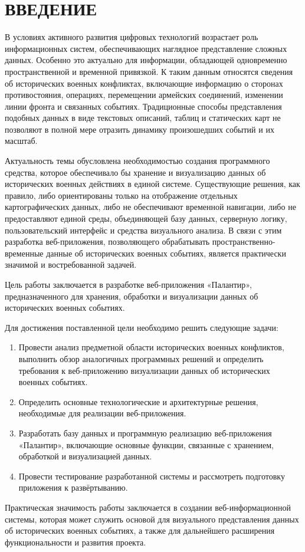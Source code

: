 \chapter*{ВВЕДЕНИЕ}

В условиях активного развития цифровых технологий возрастает роль информационных систем, обеспечивающих наглядное представление сложных данных. Особенно это актуально для информации, обладающей одновременно пространственной и временной привязкой. К таким данным относятся сведения об исторических военных конфликтах, включающие информацию о сторонах противостояния, операциях, перемещении армейских соединений, изменении линии фронта и связанных событиях. Традиционные способы представления подобных данных в виде текстовых описаний, таблиц и статических карт не позволяют в полной мере отразить динамику произошедших событий и их масштаб.

Актуальность темы обусловлена необходимостью создания программного средства, которое обеспечивало бы хранение и визуализацию данных об исторических военных действиях в единой системе. Существующие решения, как правило, либо ориентированы только на отображение отдельных картографических данных, либо не обеспечивают временной навигации, либо не предоставляют единой среды, объединяющей базу данных, серверную логику, пользовательский интерфейс и средства визуального анализа. В связи с этим разработка веб-приложения, позволяющего обрабатывать пространственно-временные данные об исторических военных событиях, является практически значимой и востребованной задачей.

Цель работы заключается в разработке веб-приложения «Палантир», предназначенного для хранения, обработки и визуализации данных об исторических военных событиях.

Для достижения поставленной цели необходимо решить следующие задачи:
\begin{enumerate}
\item Провести анализ предметной области исторических военных конфликтов, выполнить обзор аналогичных программных решений и определить требования к веб-приложению визуализации данных об исторических военных событиях.
\item Определить основные технологические и архитектурные решения, необходимые для реализации веб-приложения.
\item Разработать базу данных и программную реализацию веб-приложения «Палантир», включающие основные функции, связанные с хранением, обработкой и визуализацией данных.
\item Провести тестирование разработанной системы и рассмотреть подготовку приложения к развёртыванию.
\end{enumerate}

Практическая значимость работы заключается в создании веб-информационной системы, которая может служить основой для визуального представления данных об исторических военных событиях, а также для дальнейшего расширения функциональности и развития проекта.
